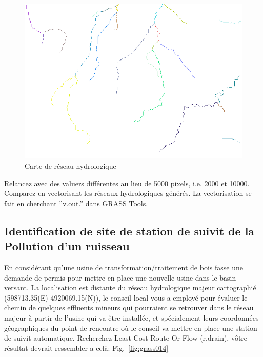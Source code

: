 \begin{figure}[htbp]
   \centering
   \includegraphics[scale=0.35]{grass013.png}
   \caption{Carte de r\'eseau hydrologique}
   \label{fig:grass013}
\end{figure}

Relancez avec des valuers diff\'erentes au lieu de 5000 pixels, i.e. 2000 et 10000.
Comparez en vectorisant les r\'eseaux hydrologiques g\'en\'er\'es. La vectorisation se fait en cherchant ''v.out.'' dans GRASS Tools.

\subsection{Identification de site de station de suivit de la Pollution d'un ruisseau}
En consid\'erant qu'une usine de transformation/traitement de bois fasse une demande de permis pour mettre en place une nouvelle usine dans le basin versant. La localisation est distante du r\'eseau hydrologique majeur cartographi\'e (598713.35(E) 4920069.15(N)), le conseil local vous a employ\'e pour \'evaluer le chemin de quelques effluents mineurs qui pourraient se retrouver dans le r\'eseau majeur \`a partir de l'usine qui va \^etre install\'ee, et sp\'ecialement leurs coordonn\'ees g\'eographiques du point de rencontre o\`u le conseil va mettre en place une station de suivit automatique.
Recherchez Least Cost Route Or Flow (r.drain), v\^otre r\'esultat devrait ressembler a cel\`a: Fig.~\ref{fig:grass014}

